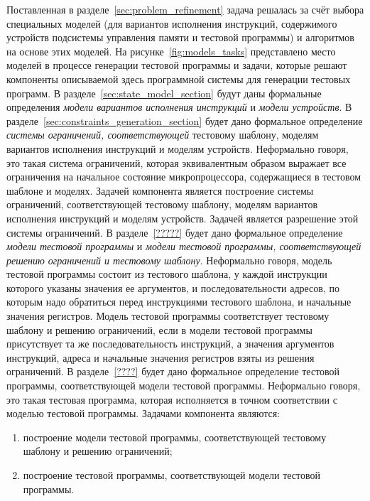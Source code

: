 Поставленная в разделе~\ref{sec:problem_refinement} задача решалась за счёт выбора специальных моделей (для вариантов исполнения инструкций, содержимого устройств подсистемы управления памяти и тестовой программы) и алгоритмов на основе этих моделей. На рисунке~\ref{fig:models_tasks} представлено место моделей в процессе генерации тестовой программы и задачи, которые решают компоненты описываемой здесь программной системы для генерации тестовых программ. В разделе~\ref{sec:state_model_section} будут даны формальные определения \emph{модели вариантов исполнения инструкций} и \emph{модели устройств}. В разделе~\ref{sec:constraints_generation_section} будет дано формальное определение \emph{системы ограничений, соответствующей} тестовому шаблону, моделям вариантов исполнения инструкций и моделям устройств. Неформально говоря, это такая система ограничений, которая эквивалентным образом выражает все ограничения на начальное состояние микропроцессора, содержащиеся в тестовом шаблоне и моделях. Задачей компонента  является построение системы ограничений, соответствующей тестовому шаблону, моделям вариантов исполнения инструкций и моделям устройств. Задачей  является разрешение этой системы ограничений. В разделе~\ref{?????} будет дано формальное определение \emph{модели тестовой программы} и \emph{модели тестовой программы, соответствующей решению ограничений и тестовому шаблону}. Неформально говоря, модель тестовой программы состоит из тестового шаблона, у каждой инструкции которого указаны значения ее аргументов, и последовательности адресов, по которым надо обратиться перед инструкциями тестового шаблона, и начальные значения регистров. Модель тестовой программы соответствует тестовому шаблону и решению ограничений, если в модели тестовой программы присутствует та же последовательность инструкций, а значения аргументов инструкций, адреса и начальные значения регистров взяты из решения ограничений. В разделе~\ref{????} будет дано формальное определение тестовой программы, соответствующей модели тестовой программы. Неформально говоря, это такая тестовая программа, которая исполняется в точном соответствии с моделью тестовой программы. Задачами компонента  являются:
\begin{enumerate}
  \item построение модели тестовой программы, соответствующей тестовому шаблону и решению ограничений;
  \item построение тестовой программы, соответствующей модели тестовой программы.
\end{enumerate}




